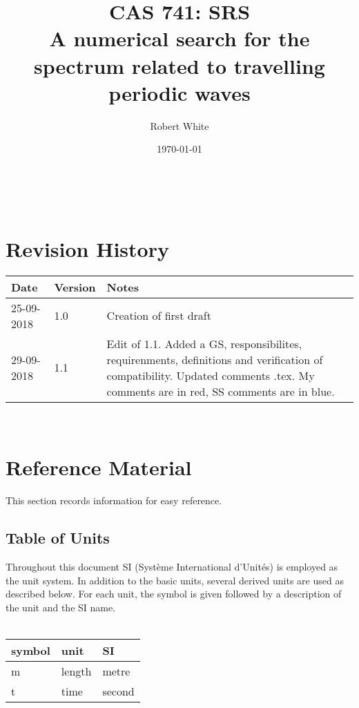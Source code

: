 \documentclass[12pt]{article}
\begin{document}
\title{CAS 741: SRS \\A numerical search for the spectrum related to travelling 
periodic waves} 
\author{Robert White}
\date{\today}
	
\maketitle

~\newpage


\section{Revision History}

\begin{tabularx}{\textwidth}{p{3cm}p{2cm}X}
\toprule {\bf Date} & {\bf Version} & {\bf Notes}\\
\midrule
25-09-2018 & 1.0 & Creation of first draft\\
29-09-2018 & 1.1 & Edit of 1.1. Added a GS, responsibilites, requirenments, 
definitions and verification of compatibility. Updated comments .tex. My 
comments are in red, SS comments are in blue.\\
\bottomrule
\end{tabularx}

~\newpage

\section{Reference Material}

This section records information for easy reference.

\subsection{Table of Units}

Throughout this document SI (Syst\`{e}me International d'Unit\'{e}s) is employed
as the unit system.  In addition to the basic units, several derived units are
used as described below.  For each unit, the symbol is given followed by a
description of the unit and the SI name. \\
~\newline

\renewcommand{\arraystretch}{1.2}
  \noindent \begin{tabular}{l l l} 
    \toprule		
    \textbf{symbol} & \textbf{unit} & \textbf{SI}\\
    \midrule 
    \si{\metre} & length & metre\\
    t & time & second\\
    \bottomrule
  \end{tabular}
\end{document}
